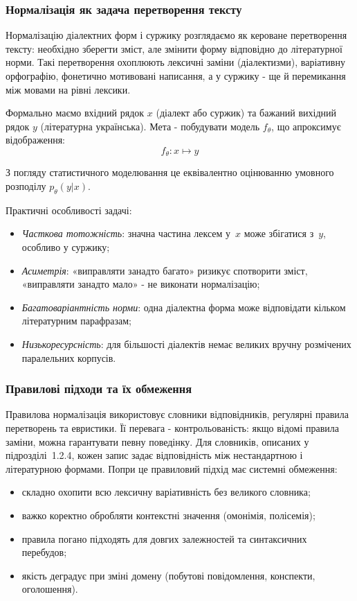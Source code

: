 \documentclass[14pt]{extarticle}
\begin{document}
\subsubsection{Нормалізація як задача перетворення тексту}

Нормалізацію діалектних форм і суржику розглядаємо як кероване перетворення тексту: необхідно зберегти зміст, але змінити форму відповідно до літературної норми. Такі перетворення охоплюють лексичні заміни (діалектизми), варіативну орфографію, фонетично мотивовані написання, а у суржику - ще й перемикання між мовами на рівні лексики.

Формально маємо вхідний рядок $x$ (діалект або суржик) та бажаний вихідний рядок $y$ (літературна українська). Мета - побудувати модель $f_\theta$, що апроксимує відображення:
\begin{equation}
  f_\theta: x \mapsto y
  \label{eq:mapping}
\end{equation}

З погляду статистичного моделювання це еквівалентно оцінюванню умовного розподілу $p_\theta(y|x)$.

Практичні особливості задачі:
\begin{itemize}
  \item \textit{Часткова тотожність}: значна частина лексем у~$x$ може збігатися з~$y$, особливо у суржику;
  \item \textit{Асиметрія}: «виправляти занадто багато» ризикує спотворити зміст, «виправляти занадто мало» - не виконати нормалізацію;
  \item \textit{Багатоваріантність норми}: одна діалектна форма може відповідати кільком літературним парафразам;
  \item \textit{Низькоресурсність}: для більшості діалектів немає великих вручну розмічених паралельних корпусів.
\end{itemize}

\subsubsection{Правилові підходи та їх обмеження}

Правилова нормалізація використовує словники відповідників, регулярні правила перетворень та евристики. Її перевага - контрольованість: якщо відомі правила заміни, можна гарантувати певну поведінку. Для словників, описаних у підрозділі~1.2.4, кожен запис задає відповідність між нестандартною і літературною формами. Попри це правиловий підхід має системні обмеження:
\begin{itemize}
  \item складно охопити всю лексичну варіативність без великого словника;
  \item важко коректно обробляти контекстні значення (омонімія, полісемія);
  \item правила погано підходять для довгих залежностей та синтаксичних перебудов;
  \item якість деградує при зміні домену (побутові повідомлення, конспекти, оголошення).
\end{itemize}
\end{document}
